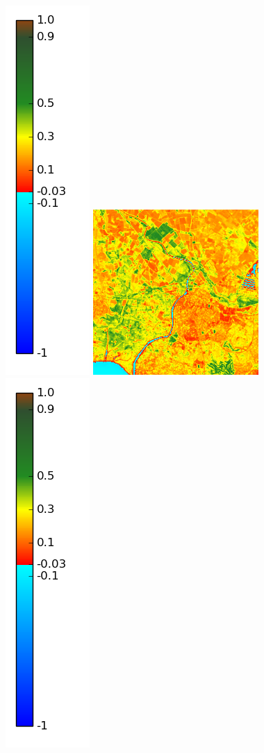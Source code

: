 \documentclass{book}
\begin{document}
\begin{figure}[H]
{\includegraphics[scale=0.2]{images/colormap.png}
\includegraphics[scale=0.4]{images/Agde/05_ndvi.png}
\includegraphics[scale=0.2]{images/colormap.png}
}
\end{figure}
\end{document}
